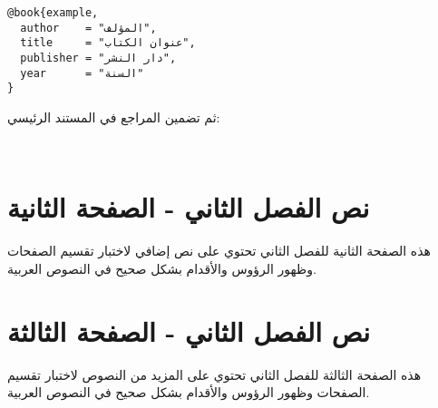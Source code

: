 \begin{verbatim}
@book{example,
  author    = "المؤلف",
  title     = "عنوان الكتاب",
  publisher = "دار النشر",
  year      = "السنة"
}
\end{verbatim}

ثم تضمين المراجع في المستند الرئيسي:

\begin{verbatim}


\end{verbatim}

\newpage

\section{نص الفصل الثاني - الصفحة الثانية}

هذه الصفحة الثانية للفصل الثاني تحتوي على نص إضافي لاختبار تقسيم الصفحات وظهور الرؤوس والأقدام بشكل صحيح في النصوص العربية.

\newpage

\section{نص الفصل الثاني - الصفحة الثالثة}

هذه الصفحة الثالثة للفصل الثاني تحتوي على المزيد من النصوص لاختبار تقسيم الصفحات وظهور الرؤوس والأقدام بشكل صحيح في النصوص العربية.
